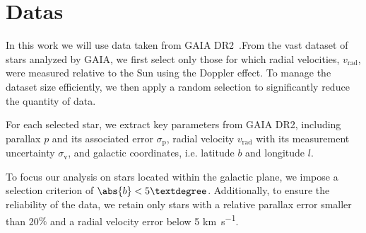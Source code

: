\section{Datas}

In this work we will use data taken from GAIA DR2~\cite{GAIADR2}.From the vast dataset of stars analyzed by GAIA, we first select only those for which radial velocities, $v_{\text{rad}}$, were measured relative to the Sun using the Doppler effect. To manage the dataset size efficiently, we then apply a random selection to significantly reduce the quantity of data.

For each selected star, we extract key parameters from GAIA DR2, including parallax $p$ and its associated error $\sigma_{\text{p}}$, radial velocity $v_{\text{rad}}$ with its measurement uncertainty $\sigma_{\text{v}}$, and galactic coordinates, i.e. latitude $b$ and longitude $l$.

To focus our analysis on stars located within the galactic plane, we impose a selection criterion of $\abs{b} < 5°$. Additionally, to ensure the reliability of the data, we retain only stars with a relative parallax error smaller than 20$\%$ and a radial velocity error below 5 \unit{\kilo\meter\per\second}.
